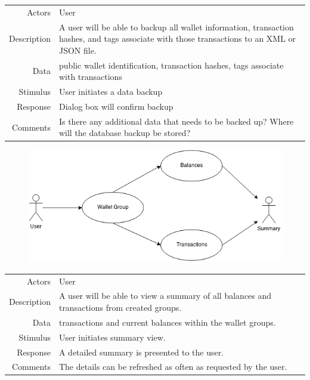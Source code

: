 \begin{table}[H]
  \tabulinesep=1.2mm
      \begin{tabu}{r | X}
        \rowfont{\color{black}}
        \\
        \hline
        \textsf{Actors} & User\\
        Description & A user will be able to backup all wallet information, transaction hashes, and tags associate with those transactions to an XML or JSON file.\\
        Data & public wallet identification, transaction hashes, tags associate with transactions\\
        Stimulus & User initiates a data backup\\
        Response & Dialog box will confirm backup\\
        Comments & Is there any additional data that needs to be backed up? Where will the database backup be stored?\\
      \end{tabu}
    \end{table}

	
    \begin{figure}[ht]
      \includegraphics[width=1.0\textwidth]{../diagrams/usecase_3_6.png}
    \end{figure}

\begin{table}[H]
  \tabulinesep=1.2mm
      \begin{tabu}{r | X}
        \rowfont{\color{black}}
        \\
        \hline
        \textsf{Actors} & User\\
        Description & A user will be able to view a summary of all balances and transactions from created groups.\\
        Data & transactions and current balances within the wallet groups.\\
        Stimulus & User initiates summary view.\\
        Response & A detailed summary is presented to the user.\\
        Comments & The details can be refreshed as often as requested by the user.\\
      \end{tabu}
    \end{table}
	
